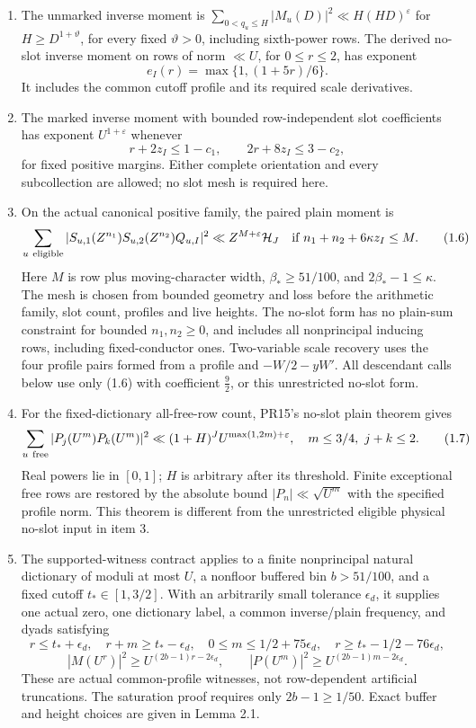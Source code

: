 \documentclass[11pt,a4paper]{article}
\begin{document}
\begin{enumerate}
\def\labelenumi{\arabic{enumi}.}
\item
  The unmarked inverse moment is
  \(\sum_{0<q_u\le H}|M_u(D)|^2\ll H(HD)^\varepsilon\) for
  \(H\ge D^{1+\vartheta}\), for every fixed \(\vartheta>0\), including
  sixth-power rows. The derived no-slot inverse moment on rows of norm
  \(\ll U\), for \(0\le r\le2\), has exponent \[
  e_I(r)=\max\{1,(1+5r)/6\}.
  \tag{1.4}
  \] It includes the common cutoff profile and its required scale
  derivatives.
\item
  The marked inverse moment with bounded row-independent slot
  coefficients has exponent \(U^{1+\varepsilon}\) whenever \[
  r+2z_I\le1-c_1,\qquad 2r+8z_I\le3-c_2,
  \tag{1.5}
  \] for fixed positive margins. Either complete orientation and every
  subcollection are allowed; no slot mesh is required here.
\item
  On the actual canonical positive family, the paired plain moment is \[
  \sum_{u\ {\rm eligible}}|S_{u,1}(Z^{n_1})S_{u,2}(Z^{n_2})Q_{u,I}|^2
   \ll Z^{M+\varepsilon}\mathcal H_J
  \quad\text{if }n_1+n_2+6\kappa z_I\le M.
  \tag{1.6}
  \] Here \(M\) is row plus moving-character width,
  \(\beta_*\ge51/100\), and \(2\beta_*-1\le\kappa\). The mesh is chosen
  from bounded geometry and loss before the arithmetic family, slot
  count, profiles and live heights. The no-slot form has no plain-sum
  constraint for bounded \(n_1,n_2\ge0\), and includes all nonprincipal
  inducing rows, including fixed-conductor ones. Two-variable scale
  recovery uses the four profile pairs formed from a profile and
  \(-W/2-yW'\). All descendant calls below use only (1.6) with
  coefficient \(\frac{9}{2}\), or this unrestricted no-slot form.
\item
  For the fixed-dictionary all-free-row count, PR15's no-slot plain
  theorem gives \[
  \sum_{u\ {\rm free}}|P_j(U^m)P_k(U^m)|^2
   \ll (1+H)^J U^{\max(1,2m)+\varepsilon},
  \quad m\le3/4,\ j+k\le2.
  \tag{1.7}
  \] Real powers lie in \([0,1]\); \(H\) is arbitrary after its
  threshold. Finite exceptional free rows are restored by the absolute
  bound \(|P_n|\ll\sqrt{U^m}\) with the specified profile norm. This
  theorem is different from the unrestricted eligible physical no-slot
  input in item 3.
\item
  The supported-witness contract applies to a finite nonprincipal
  natural dictionary of moduli at most \(U\), a nonfloor buffered bin
  \(b>51/100\), and a fixed cutoff \(t_*\in[1,3/2]\). With an
  arbitrarily small tolerance \(\epsilon_d\), it supplies one actual
  zero, one dictionary label, a common inverse/plain frequency, and
  dyads satisfying \[
  r\le t_*+\epsilon_d,\quad r+m\ge t_*-\epsilon_d,
  \quad0\le m\le1/2+75\epsilon_d,
  \quad r\ge t_*-1/2-76\epsilon_d,
  \tag{1.8}
  \] \[
  |M(U^r)|^2\ge U^{(2b-1)r-2\epsilon_d},\qquad
  |P(U^m)|^2\ge U^{(2b-1)m-2\epsilon_d}.
  \tag{1.9}
  \] These are actual common-profile witnesses, not row-dependent
  artificial truncations. The saturation proof requires only
  \(2b-1\ge1/50\). Exact buffer and height choices are given in Lemma
  2.1.
\end{enumerate}
\end{document}
